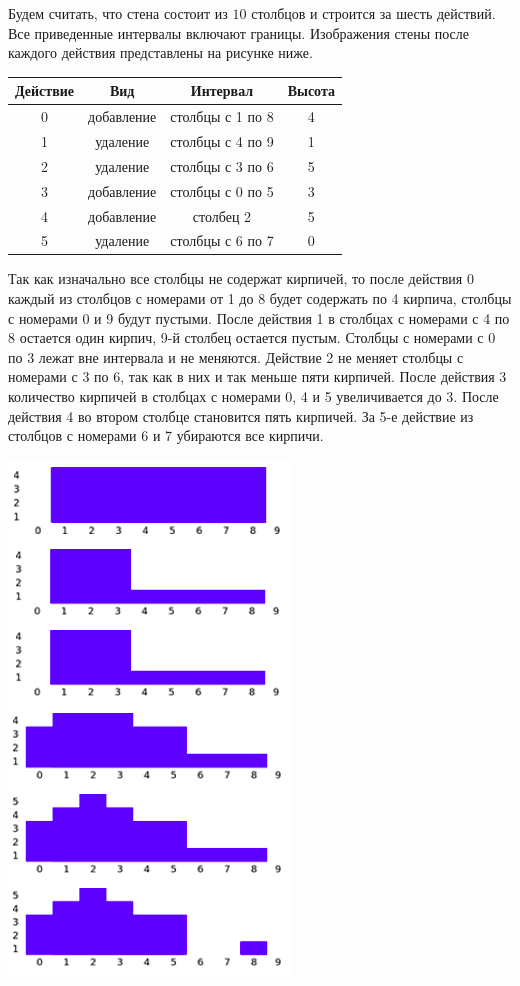 Будем считать, что стена состоит из $10$ столбцов и строится за шесть действий. Все
приведенные интервалы включают границы. Изображения стены после каждого действия
представлены на рисунке ниже.

\begin{center}
\renewcommand{\arraystretch}{1.5}
\begin{tabular}{ |c|c|c|c| }
\hline
Действие & Вид & Интервал & Высота\\
\hline
0 & добавление & столбцы с 1 по 8 & 4 \\
\hline
1 & удаление & столбцы с 4 по 9 & 1 \\
\hline
2 & удаление & столбцы с 3 по 6 & 5 \\
\hline
3 & добавление & столбцы с 0 по 5 & 3 \\
\hline
4 & добавление & столбец 2 & 5 \\
\hline
5 & удаление & столбцы с 6 по 7 & 0 \\
\hline
\end{tabular}
\end{center}

Так как изначально все столбцы не содержат кирпичей, то после действия 0 каждый из
столбцов с номерами от 1 до 8 будет содержать по 4 кирпича, столбцы с номерами 0 и 9 будут
пустыми. После действия 1 в столбцах с номерами с 4 по 8 остается один кирпич, 9-й
столбец остается пустым. Столбцы с номерами с 0 по 3 лежат вне интервала и не меняются.
Действие 2 не меняет столбцы с номерами с 3 по 6, так как в них и так меньше пяти кирпичей.
После действия 3 количество кирпичей в столбцах с номерами 0, 4 и 5 увеличивается до 3.
После действия 4 во втором столбце становится пять кирпичей. За 5-е действие из столбцов с номерами 6 и 7 убираются все кирпичи.

\includegraphics{1.png}